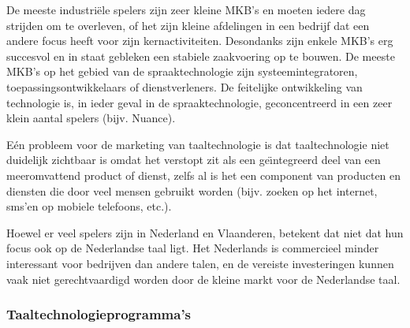 \begin{multicols}{2}
    De meeste industri{\"e}le spelers zijn zeer kleine MKB's en moeten iedere dag strijden om te overleven, of het zijn kleine afdelingen in een bedrijf dat een andere focus heeft voor zijn kernactiviteiten. Desondanks zijn enkele MKB's erg succesvol en in staat gebleken een stabiele zaakvoering op te bouwen. De meeste MKB's op het gebied van de spraaktechnologie zijn systeemintegratoren, toepassingsontwikkelaars of dienstverleners. De feitelijke ontwikkeling van technologie is, in ieder geval in de spraaktechnologie, geconcentreerd in een zeer klein aantal spelers (bijv. Nuance).

    E{\'e}n probleem voor de marketing van taaltechnologie is dat taaltechnologie niet duidelijk zichtbaar is omdat het verstopt zit als een ge{\"\i}ntegreerd deel van een meeromvattend product of dienst, zelfs al is het een component van producten en diensten die door veel mensen gebruikt worden (bijv. zoeken op het internet, sms'en op mobiele telefoons, etc.).

    Hoewel er veel spelers zijn in Nederland en Vlaanderen, betekent dat niet dat hun focus ook op de Nederlandse taal ligt. Het Nederlands is commercieel minder interessant voor bedrijven dan andere talen, en de vereiste investeringen kunnen vaak niet gerechtvaardigd worden door de kleine markt voor de Nederlandse taal.

\subsubsection{Taaltechnologieprogramma's}


\end{multicols}

